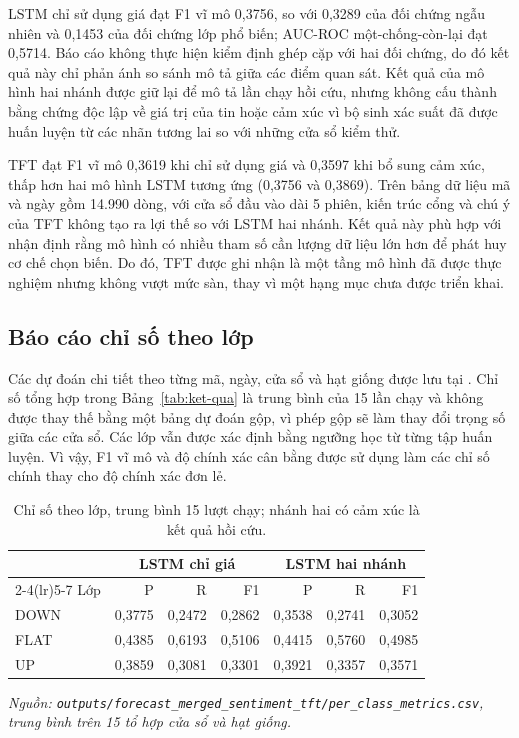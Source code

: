 \documentclass[12pt, a4paper, oneside]{report}
\begin{document}
LSTM chỉ sử dụng giá đạt F1 vĩ mô 0,3756, so với 0,3289 của đối chứng ngẫu nhiên và 0,1453 của
đối chứng lớp phổ biến; AUC-ROC một-chống-còn-lại đạt 0,5714. Báo cáo không thực hiện
kiểm định ghép cặp với hai đối chứng, do đó kết quả này chỉ phản ánh so sánh mô tả giữa các điểm
quan sát. Kết quả của mô hình hai nhánh được giữ lại để mô tả lần chạy hồi cứu, nhưng không
cấu thành bằng chứng độc lập về giá trị của tin hoặc cảm xúc vì bộ sinh xác suất đã được huấn luyện
từ các nhãn tương lai so với những cửa sổ kiểm thử.

TFT đạt F1 vĩ mô 0,3619 khi chỉ sử dụng giá và 0,3597 khi bổ sung cảm xúc, thấp hơn
hai mô hình LSTM tương ứng (0,3756 và 0,3869). Trên bảng dữ liệu mã và ngày gồm 14.990
dòng, với cửa sổ đầu vào dài 5 phiên, kiến trúc cổng và chú ý của TFT không tạo ra
lợi thế so với LSTM hai nhánh. Kết quả này phù hợp với nhận định rằng mô hình có nhiều
tham số cần lượng dữ liệu lớn hơn để phát huy cơ chế chọn biến. Do đó, TFT được ghi nhận
là một tầng mô hình đã được thực nghiệm nhưng không vượt mức sàn, thay vì một hạng mục chưa được triển khai.

\subsection{Báo cáo chỉ số theo lớp}

Các dự đoán chi tiết theo từng mã, ngày, cửa sổ và hạt giống được lưu tại
. Chỉ số tổng hợp
trong Bảng~\ref{tab:ket-qua} là trung bình của 15 lần chạy và không được thay thế bằng một bảng
dự đoán gộp, vì phép gộp sẽ làm thay đổi trọng số giữa các cửa sổ. Các lớp vẫn được xác định bằng ngưỡng học
từ từng tập huấn luyện. Vì vậy, F1 vĩ mô và độ chính xác cân bằng được sử dụng làm các chỉ số chính
thay cho độ chính xác đơn lẻ.

\begin{table}[H]
  \centering
  \small
  \caption{Chỉ số theo lớp, trung bình 15 lượt chạy; nhánh hai có cảm xúc là kết quả hồi cứu.}
  \label{tab:kq-theo-lop}
  \begin{tabular}{l rrr rrr}
    \toprule
    & \multicolumn{3}{c}{LSTM chỉ giá} & \multicolumn{3}{c}{LSTM hai nhánh} \\
    \cmidrule(lr){2-4}\cmidrule(lr){5-7}
    Lớp & P & R & F1 & P & R & F1 \\
    \midrule
    DOWN & 0,3775 & 0,2472 & 0,2862 & 0,3538 & 0,2741 & 0,3052 \\
    FLAT & 0,4385 & 0,6193 & 0,5106 & 0,4415 & 0,5760 & 0,4985 \\
    UP   & 0,3859 & 0,3081 & 0,3301 & 0,3921 & 0,3357 & 0,3571 \\
    \bottomrule
  \end{tabular}
\end{table}
\noindent\textit{Nguồn: \texttt{outputs/forecast\_merged\_sentiment\_tft/per\_class\_metrics.csv}, trung bình trên 15 tổ hợp cửa sổ và hạt giống.}
\end{document}
